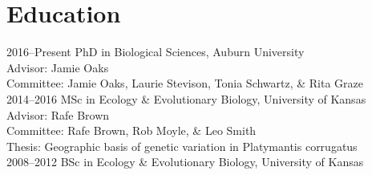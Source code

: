 
\section*{Education}

  2016--Present PhD in Biological Sciences, Auburn University\\
  Advisor: Jamie Oaks\\
  Committee: Jamie Oaks, Laurie Stevison, Tonia Schwartz, \& Rita Graze\\

  2014--2016 MSc in Ecology \& Evolutionary Biology, University of Kansas\\
  Advisor: Rafe Brown\\
  Committee: Rafe Brown, Rob Moyle, \& Leo Smith\\
  Thesis: Geographic basis of genetic variation in Platymantis corrugatus\\

  2008--2012 BSc in Ecology \& Evolutionary Biology, University of Kansas

